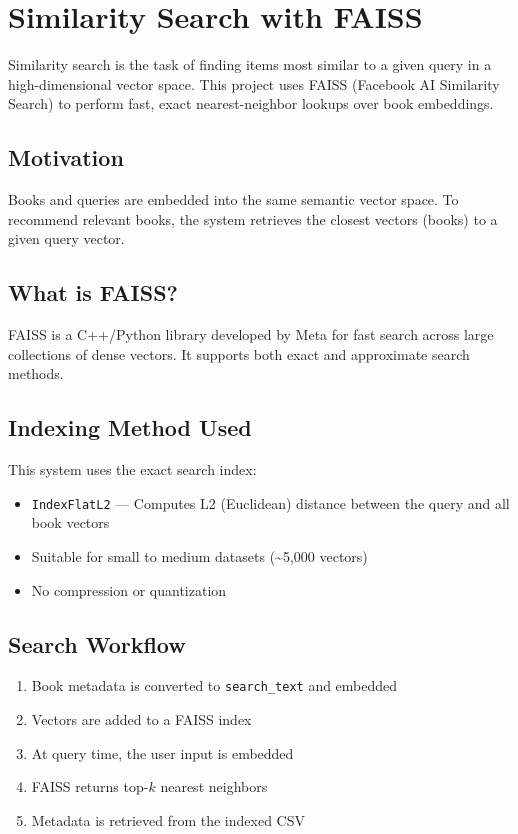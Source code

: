 \chapter{Similarity Search with FAISS}
\label{appendix:faiss}

Similarity search is the task of finding items most similar to a given query in a high-dimensional vector space. This project uses FAISS (Facebook AI Similarity Search) to perform fast, exact nearest-neighbor lookups over book embeddings.

\section*{Motivation}
Books and queries are embedded into the same semantic vector space. To recommend relevant books, the system retrieves the closest vectors (books) to a given query vector.

\section*{What is FAISS?}
FAISS is a C++/Python library developed by Meta for fast search across large collections of dense vectors. It supports both exact and approximate search methods.

\section*{Indexing Method Used}
This system uses the exact search index:
\begin{itemize}
  \item \texttt{IndexFlatL2} — Computes L2 (Euclidean) distance between the query and all book vectors
  \item Suitable for small to medium datasets (\textasciitilde5,000 vectors)
  \item No compression or quantization
\end{itemize}

\section*{Search Workflow}
\begin{enumerate}
  \item Book metadata is converted to \texttt{search\_text} and embedded
  \item Vectors are added to a FAISS index
  \item At query time, the user input is embedded
  \item FAISS returns top-$k$ nearest neighbors
  \item Metadata is retrieved from the indexed CSV
\end{enumerate}

